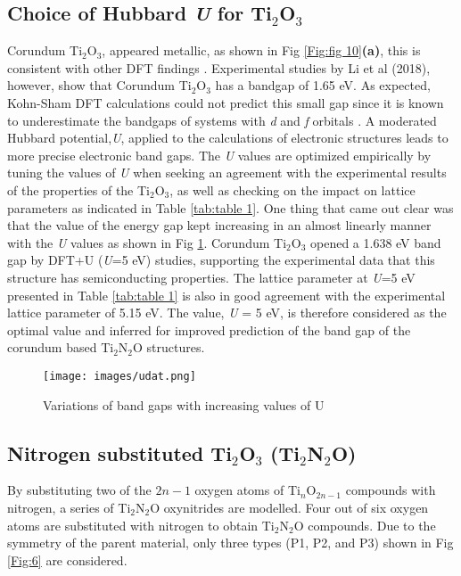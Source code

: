 \documentclass[aps,prb,superscriptaddress,twocolumn,floatfix,showpacs,amsmath]{revtex4-1}
\begin{document}
\subsection{Choice of Hubbard \textit{U} for Ti$_{2}$O$_{3}$}
Corundum Ti$_{2}$O$_{3}$, appeared metallic, as shown in Fig \ref{Fig:fig 10}\textbf{(a)}, this is consistent with other DFT findings \cite{aoki2019insulating}. Experimental studies by Li et al (2018)\cite{li2018titanium}, however, show that Corundum Ti$_{2}$O$_{3}$ has a bandgap of  1.65 eV. As expected, Kohn-Sham DFT calculations could not predict this small gap since it is known to underestimate the bandgaps of systems with \textit{d} and \textit{f} orbitals \cite{hu2011choice}. A moderated Hubbard potential,\textit{U}, applied to the calculations of electronic structures leads to more precise electronic band gaps. The \textit{U} values are optimized empirically by tuning the values of \textit{U} when seeking an agreement with the experimental results of the properties of the  Ti$_{2}$O$_{3}$\cite{hu2011choice}, as well as checking on the impact on lattice parameters as indicated in Table \ref{tab:table 1}. One thing that came out clear was that the value of the energy gap kept increasing in an almost linearly manner with the \textit{U} values as shown in Fig \ref{Fig:2}.  Corundum Ti$_{2}$O$_{3}$ opened a 1.638 eV band gap by DFT+U (\textit{U}=5 eV) studies, supporting the experimental data that this structure has semiconducting properties. The lattice parameter at \textit{U}=5 eV presented in Table \ref{tab:table 1} is also in good agreement with the experimental lattice parameter\cite{li2018titanium} of 5.15 eV. The value, \textit{U} = 5 eV, is therefore considered as the optimal value and inferred for improved prediction of the band gap of the corundum \-based Ti$_{2}$N$_{2}$O structures.

\begin{figure}[H]
   \centering
    \texttt{[image: images/udat.png]}
    \caption{Variations of band gaps with increasing values of U}
    \label{Fig:2}
\end{figure}

\subsection {Nitrogen substituted Ti$_{2}$O$_{3}$ (Ti$_{2}$N$_{2}$O)}

By substituting two of the ${2n-1}$ oxygen atoms of Ti$_{n}$O$_{2n-1}$ compounds with nitrogen, a series of Ti$_{2}$N$_{2}$O oxynitrides are modelled. Four out of six oxygen atoms are substituted with nitrogen to obtain  Ti$_{2}$N$_{2}$O compounds. Due to the symmetry of the  parent material, only three types (P1, P2, and P3) shown in Fig \ref{Fig:6} are considered.
\end{document}
